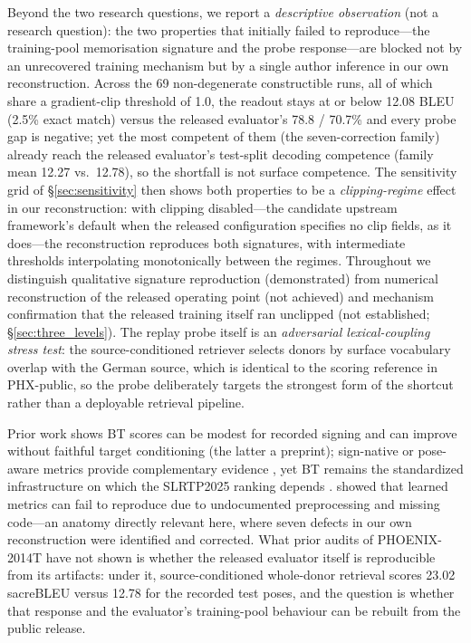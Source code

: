 \documentclass[pdflatex,sn-chicago]{sn-jnl}
\begin{document}
\noindent Beyond the two research questions, we report a \emph{descriptive observation} (not a research question): the two properties that initially failed to reproduce---the training-pool memorisation signature and the probe response---are blocked not by an unrecovered training mechanism but by a single author inference in our own reconstruction. Across the 69 non-degenerate constructible runs, all of which share a gradient-clip threshold of 1.0, the readout stays at or below 12.08 BLEU (2.5\% exact match) versus the released evaluator's 78.8 / 70.7\% and every probe gap is negative; yet the most competent of them (the seven-correction family) already reach the released evaluator's test-split decoding competence (family mean 12.27 vs.\ 12.78), so the shortfall is not surface competence. The sensitivity grid of \S\ref{sec:sensitivity} then shows both properties to be a \emph{clipping-regime} effect in our reconstruction: with clipping disabled---the candidate upstream framework's default when the released configuration specifies no clip fields, as it does---the reconstruction reproduces both signatures, with intermediate thresholds interpolating monotonically between the regimes. Throughout we distinguish qualitative signature reproduction (demonstrated) from numerical reconstruction of the released operating point (not achieved) and mechanism confirmation that the released training itself ran unclipped (not established; \S\ref{sec:three_levels}). The replay probe itself is an \emph{adversarial lexical-coupling stress test}: the source-conditioned retriever selects donors by surface vocabulary overlap with the German source, which is identical to the scoring reference in PHX-public, so the probe deliberately targets the strongest form of the shortcut rather than a deployable retrieval pipeline.

Prior work shows BT scores can be modest for recorded signing and can improve without faithful target conditioning \cite{walsh2024datadriven,hong2026conditional} (the latter a preprint); sign-native or pose-aware metrics provide complementary evidence \cite{signbleu,silverscore,jiang2025meaningful}, yet BT remains the standardized infrastructure on which the SLRTP2025 ranking depends \cite{slrtp2025}. \citet{chen2022repro} showed that learned metrics can fail to reproduce due to undocumented preprocessing and missing code---an anatomy directly relevant here, where seven defects in our own reconstruction were identified and corrected. What prior audits of PHOENIX-2014T have not shown is whether the released evaluator itself is reproducible from its artifacts: under it, source-conditioned whole-donor retrieval scores 23.02 sacreBLEU versus 12.78 for the recorded test poses, and the question is whether that response and the evaluator's training-pool behaviour can be rebuilt from the public release.
\end{document}

